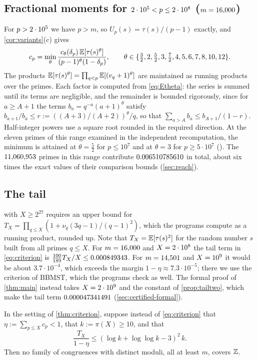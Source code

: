 \subsection{Fractional moments for $2\cdot 10^{5}<p\le2\cdot 10^{8}$ ($m=16{,}000$)}\label{sec:theta}

For $p>2\cdot 10^{5}$ we have $p>m$, so $U_p(s)=\tau(s)/(p-1)$ exactly, and \cref{cor:variants}(c) gives
\[
  c_p=\min_\theta\frac{c_\theta(\delta_p)\,\mathbb{E}[\tau(s)^\theta]}{(p-1)^\theta(1-\delta_p)},\qquad
  \theta\in\{\tfrac32,2,\tfrac52,3,\tfrac72,4,5,6,7,8,10,12\}.
\]
The products $\mathbb{E}[\tau(s)^\theta]=\prod_{q<p}\mathbb{E}[(v_q+1)^\theta]$ are maintained as running products over the primes.
Each factor is computed from \eqref{eq:Etheta}: the series is summed until its terms are negligible, and the
remainder is bounded rigorously, since for $a\ge A+1$ the terms $b_a=q^{-a}(a+1)^\theta$ satisfy
$b_{a+1}/b_a\le r:=((A+3)/(A+2))^\theta/q$, so that $\sum_{a>A}b_a\le b_{A+1}/(1-r)$. Half-integer powers use a
square root rounded in the required direction. At the eleven primes of this range examined in the independent
recomputation, the minimum is attained at $\theta=\frac52$ for $p\le10^7$ and at $\theta=3$ for $p\ge5\cdot10^7$
(). The $11{,}060{,}953$ primes in this range contribute $0.006510785610$ in
total, about six times the exact values of their comparison bounds (\cref{sec:reach}).

\subsection{The tail}\label{sec:tail}

 with $X\ge2^{27}$ requires an upper bound for
$T_X=\prod_{q\le X}(1+\nu_q(3q-1)/(q-1)^2)$, which the programs compute as a running product, rounded up. Note that
$T_X=\mathbb{E}[\tau(s)^2]$ for the random number $s$ built from all primes $q\le X$. For $m=16{,}000$ and $X=2\cdot 10^{8}$ the
tail term in \eqref{eq:criterion} is $\frac{100}{189}T_X/X\le0.000849343$. For $m=14{,}501$ and $X=10^{9}$ it would be
about $3.7\cdot10^{-4}$, which exceeds the margin $1-\eta\approx7.3\cdot10^{-5}$; there we use the criterion of BBMST,
which the programs check as well. The formal proof of \cref{thm:main} instead takes $X=2\cdot10^{9}$ and the constant of
\cref{prop:tailtwo}, which make the tail term $0.000047341491$ (\cref{sec:certified-formal}).

\begin{proposition}\label{prop:bbmst61}
In the setting of \cref{thm:criterion}, suppose instead of \eqref{eq:criterion} that $\eta:=\sum_{p\le X}c_p<1$,
that $k:=\pi(X)\ge10$, and that
\[
  \frac{T_X}{1-\eta}\le(\log k+\log\log k-3)^2\,k .
\]
Then no family of congruences with distinct moduli, all at least $m$, covers $\mathbb{Z}$.
\end{proposition}

